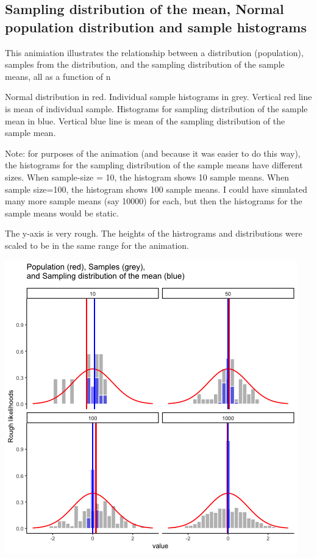 \documentclass[
]{book}
\begin{document}
\hypertarget{sampling-distribution-of-the-mean-normal-population-distribution-and-sample-histograms}{%
\subsection{Sampling distribution of the mean, Normal population distribution and sample histograms}\label{sampling-distribution-of-the-mean-normal-population-distribution-and-sample-histograms}}

This animiation illustrates the relationship between a distribution (population), samples from the distribution, and the sampling distribution of the sample means, all as a function of n

Normal distribution in red. Individual sample histograms in grey. Vertical red line is mean of individual sample. Histograms for sampling distribution of the sample mean in blue. Vertical blue line is mean of the sampling distribution of the sample mean.

Note: for purposes of the animation (and because it was easier to do this way), the histograms for the sampling distribution of the sample means have different sizes. When sample-size = 10, the histogram shows 10 sample means. When sample size=100, the histogram shows 100 sample means. I could have simulated many more sample means (say 10000) for each, but then the histograms for the sample means would be static.

The y-axis is very rough. The heights of the histrograms and distributions were scaled to be in the same range for the animation.

\includegraphics{gifs/sampleDistNormal-1.gif}
\end{document}
